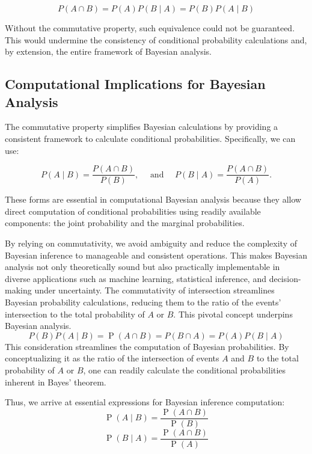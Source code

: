 \documentclass[
  12 pt,
  a4paper,
]{book}
\numberwithin{equation}{section}
\theoremstyle{plain}      %
\theoremstyle{definition} %
\theoremstyle{remark}     %
\theoremstyle{note}         %
\begin{document}
\[
P(A \cap B)=P(A) P(B \mid A)=P(B) P(A \mid B)
\]

Without the commutative property, such equivalence could not be
guaranteed. This would undermine the consistency of conditional
probability calculations and, by extension, the entire framework of
Bayesian analysis.

\hypertarget{computational-implications-for-bayesian-analysis}{%
\subsection{Computational Implications for Bayesian
Analysis}\label{computational-implications-for-bayesian-analysis}}

The commutative property simplifies Bayesian calculations by providing a
consistent framework to calculate conditional probabilities.
Specifically, we can use:

\[
P(A \mid B)=\frac{P(A \cap B)}{P(B)}, \quad \text { and } \quad P(B \mid A)=\frac{P(A \cap B)}{P(A)} .
\]

These forms are essential in computational Bayesian analysis because
they allow direct computation of conditional probabilities using readily
available components: the joint probability and the marginal
probabilities.

By relying on commutativity, we avoid ambiguity and reduce the
complexity of Bayesian inference to manageable and consistent
operations. This makes Bayesian analysis not only theoretically sound
but also practically implementable in diverse applications such as
machine learning, statistical inference, and decision-making under
uncertainty. The commutativity of intersection streamlines Bayesian
probability calculations, reducing them to the ratio of the events'
intersection to the total probability of \(A\) or \(B\). This pivotal
concept underpins Bayesian analysis. \[
P(B) P(A \mid B)=\operatorname{P}(A \cap B)=P(B \cap A)=P(A) P(B \mid A)
\] This consideration streamlines the computation of Bayesian
probabilities. By conceptualizing it as the ratio of the intersection of
events \(A\) and \(B\) to the total probability of \(A\) or \(B\), one
can readily calculate the conditional probabilities inherent in Bayes'
theorem.

Thus, we arrive at essential expressions for Bayesian inference
computation: \[
\operatorname{P}(A\! \mid\! B)=\frac{\operatorname{P}(A \cap B)}{\operatorname{P}(B)}
\] \[
\operatorname{P}(B\! \mid\! A)=\frac{\operatorname{P}(A \cap B)}{\operatorname{P}(A)}
\]
\end{document}
